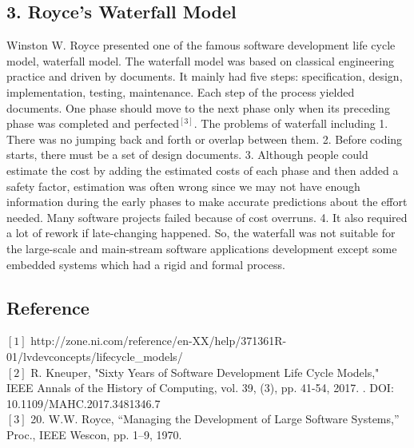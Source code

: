 \documentclass[11pt]{report}
\begin{document}
\subsection*{3. Royce’s Waterfall Model}
Winston W. Royce presented one of the famous software development life cycle model, waterfall model. The waterfall model was based on classical engineering practice and driven by documents. It mainly had five steps: specification, design, implementation, testing, maintenance. Each step of the process yielded documents. One phase should move to the next phase only when its preceding phase was completed and perfected$^{[3]}$.
The problems of waterfall including 1. There was no jumping back and forth or overlap between them. 2. Before coding starts, there must be a set of design documents. 3. Although people could estimate the cost by adding the estimated costs of each phase and then added a safety factor, estimation was often wrong since we may not have enough information during the early phases to make accurate predictions about the effort needed. Many software projects failed because of cost overruns. 4. It also required a lot of rework if late-changing happened. So, the waterfall was not suitable for the large-scale and main-stream software applications development except some embedded systems which had a rigid and formal process.\\
\subsection*{Reference}
$\left[1\right]$ http://zone.ni.com/reference/en-XX/help/371361R-01/lvdevconcepts/lifecycle\_models/\\
$\left[2\right]$ R. Kneuper, "Sixty Years of Software Development Life Cycle Models," IEEE Annals of the History of Computing, vol. 39, (3), pp. 41-54, 2017. . DOI: 10.1109/MAHC.2017.3481346.7\\
$\left[3\right]$ 20. W.W. Royce, “Managing the Development of Large Software Systems,” Proc., IEEE Wescon, pp. 1–9, 1970.
\end{document}
